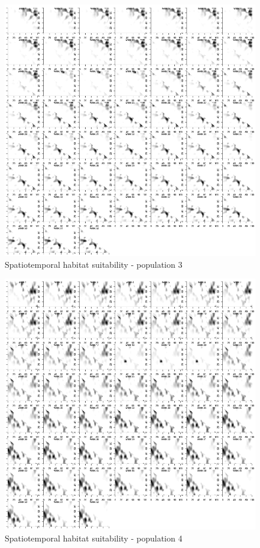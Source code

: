 \documentclass[review]{elsarticle}
\begin{document}
\begin{figure}[!ht]
	\includegraphics[width = \linewidth]{Plots/habitat_spatiotemp_spp_3}
	\caption{Spatiotemporal habitat suitability - population 3}
	\label{fig:7}
\end{figure}

\begin{figure}[!ht]
	\includegraphics[width = \linewidth]{Plots/habitat_spatiotemp_spp_4}
	\caption{Spatiotemporal habitat suitability - population 4}
	\label{fig:8}
\end{figure}
\end{document}
